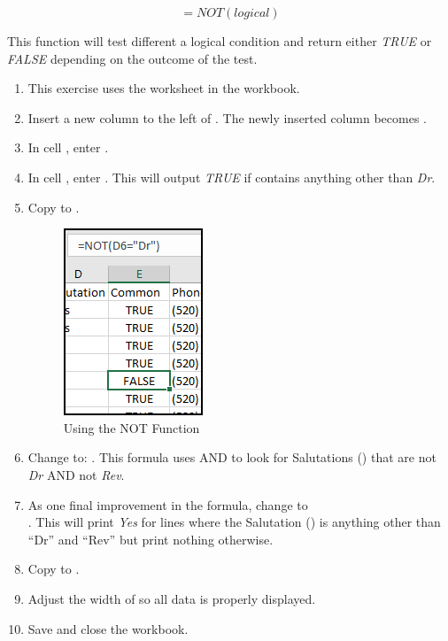 \[ =NOT(logical) \]

This function will test different a logical condition and return either \textit{TRUE} or \textit{FALSE} depending on the outcome of the test.

\begin{enumerate}
	\item This exercise uses the  worksheet in the  workbook.
	\item Insert a new column to the left of . The newly inserted column becomes .
	\item In cell , enter .
	\item In cell , enter . This will output \textit{TRUE} if  contains anything other than \textit{Dr}. 
	\item Copy  to .
	
	\begin{figure}[H]
		\centering
		\includegraphics[width=\maxwidth{.50\linewidth}]{gfx/ch09_fig48}
		\caption{Using the NOT Function}
		\label{09:fig48}
	\end{figure}
	
	\item Change  to: . This formula uses AND to look for Salutations () that are not \textit{Dr} AND not \textit{Rev}.
	\item As one final improvement in the formula, change  to  \\. This will print \textit{Yes} for lines where the Salutation () is anything other than ``Dr'' and ``Rev'' but print nothing otherwise.	
	\item Copy  to .
	\item Adjust the width of  so all data is properly displayed.
	\item Save and close the  workbook.
\end{enumerate}

